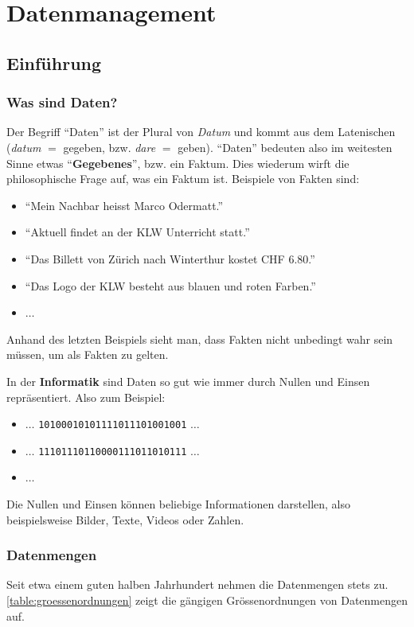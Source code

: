 \setcounter{chapter}{4}

\chapter{Datenmanagement}\label{ch:Lektion}
\section{Einführung}

\subsection{Was sind Daten?}

Der Begriff \enquote{Daten} ist der Plural von \textit{Datum} und kommt aus dem Latenischen (\textit{datum} $=$ gegeben,
bzw. \textit{dare} $=$ geben). \enquote{Daten} bedeuten also im weitesten Sinne etwas \enquote{\textbf{Gegebenes}}, bzw. ein Faktum. Dies wiederum wirft die philosophische Frage auf, was ein Faktum ist. Beispiele von Fakten sind:
\begin{itemize}
  \item \enquote{Mein Nachbar heisst Marco Odermatt.}
  \item \enquote{Aktuell findet an der KLW Unterricht statt.}
  \item \enquote{Das Billett von Zürich nach Winterthur kostet CHF 6.80.}
  \item \enquote{Das Logo der KLW besteht aus blauen und roten Farben.}
  \item $\ldots$
\end{itemize}
Anhand des letzten Beispiels sieht man, dass Fakten nicht unbedingt wahr sein müssen, um als Fakten zu gelten.

In der \textbf{Informatik} sind Daten so gut wie immer durch Nullen und Einsen repräsentiert. Also zum Beispiel:
\begin{itemize}
  \item $\ldots$ \verb|10100010101111011101001001| $\ldots$
  \item $\ldots$ \verb|11101110110000111011010111| $\ldots$
  \item $\ldots$
\end{itemize}
Die Nullen und Einsen können beliebige Informationen darstellen, also beispielsweise Bilder, Texte, Videos oder Zahlen.

\subsection{Datenmengen}
Seit etwa einem guten halben Jahrhundert nehmen die Datenmengen stets zu. \cref{table:groessenordnungen} zeigt die gängigen Grössenordnungen von Datenmengen auf.

